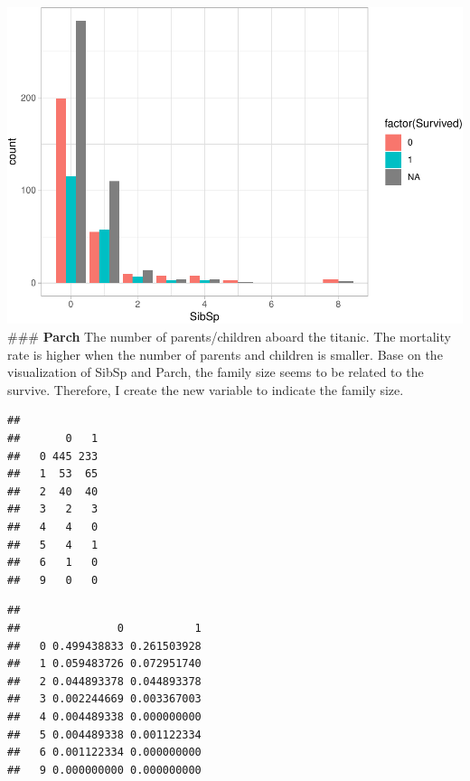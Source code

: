 \documentclass[
]{article}
\newenvironment{Shaded}{\begin{snugshade}}{\end{snugshade}}
\newcommand{\FunctionTok}[1]{\textcolor[rgb]{0.00,0.00,0.00}{#1}}
\newcommand{\NormalTok}[1]{#1}
\newcommand{\SpecialCharTok}[1]{\textcolor[rgb]{0.00,0.00,0.00}{#1}}
\begin{document}
\includegraphics{final_pdf_files/figure-latex/unnamed-chunk-13-1.pdf}
\#\#\# \textbf{Parch} The number of parents/children aboard the titanic.
The mortality rate is higher when the number of parents and children is
smaller. Base on the visualization of SibSp and Parch, the family size
seems to be related to the survive. Therefore, I create the new variable
to indicate the family size.

\begin{Shaded}
\end{Shaded}

\begin{verbatim}
##    
##       0   1
##   0 445 233
##   1  53  65
##   2  40  40
##   3   2   3
##   4   4   0
##   5   4   1
##   6   1   0
##   9   0   0
\end{verbatim}

\begin{Shaded}
\end{Shaded}

\begin{verbatim}
##    
##               0           1
##   0 0.499438833 0.261503928
##   1 0.059483726 0.072951740
##   2 0.044893378 0.044893378
##   3 0.002244669 0.003367003
##   4 0.004489338 0.000000000
##   5 0.004489338 0.001122334
##   6 0.001122334 0.000000000
##   9 0.000000000 0.000000000
\end{verbatim}
\end{document}
